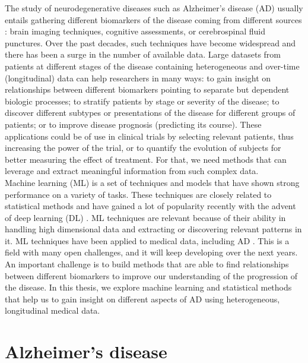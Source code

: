 The study of neurodegenerative diseases such as Alzheimer's disease (AD) usually entails gathering different biomarkers of the disease coming from different sources \cite{Jack2010}: brain imaging techniques, cognitive assessments, or cerebrospinal fluid punctures. Over the past decades, such techniques have become widespread and there has been a surge in the number of available data. Large datasets from patients at different stages of the disease containing heterogeneous and over-time (longitudinal) data can help researchers in many ways: to gain insight on relationships between different biomarkers pointing to separate but dependent biologic processes; to stratify patients by stage or severity of the disease; to discover different subtypes or presentations of the disease for different groups of patients; or to improve disease prognosis (predicting its course). These applications could be of use in clinical trials by selecting relevant patients, thus increasing the power of the trial, or to quantify the evolution of subjects for better measuring the effect of treatment. For that, we need methods that can leverage and extract meaningful information from such complex data. \\

Machine learning (ML) is a set of techniques and models that have shown strong performance on a variety of tasks. These techniques are closely related to statistical methods and have gained a lot of popularity recently with the advent of deep learning (DL) \cite{LeCun2015}. ML techniques are relevant because of their ability in handling high dimensional data and extracting or discovering relevant patterns in it. ML techniques have been applied to medical data, including AD \cite{Litjens2017,Ching2018}. This is a field with many open challenges, and it will keep developing over the next years. An important challenge is to build methods that are able to find relationships between different biomarkers to improve our understanding of the progression of the disease. In this thesis, we explore machine learning and statistical methods that help us to gain insight on different aspects of AD using heterogeneous, longitudinal medical data. \\

\section{Alzheimer's disease}

